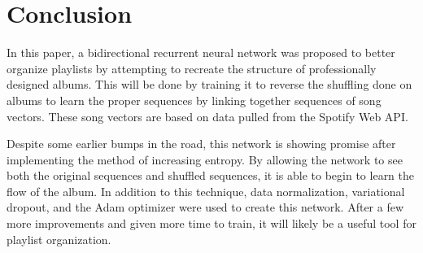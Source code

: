 \documentclass{article}
\begin{document}
\section{Conclusion}
In this paper, a bidirectional recurrent neural network was proposed to better organize playlists by attempting to recreate the structure of professionally designed albums. This will be done by training it to reverse the shuffling done on albums to learn the proper sequences by linking together sequences of song vectors. These song vectors are based on data pulled from the Spotify Web API.

Despite some earlier bumps in the road, this network is showing promise after implementing the method of increasing entropy. By allowing the network to see both the original sequences and shuffled sequences, it is able to begin to learn the flow of the album. In addition to this technique, data normalization, variational dropout, and the Adam optimizer were used to create this network. After a few more improvements and given more time to train, it will likely be a useful tool for playlist organization.



\end{document}
